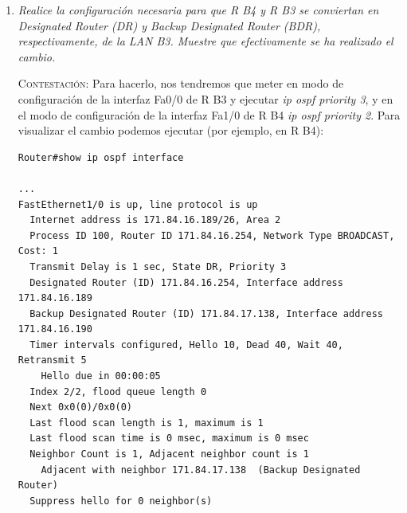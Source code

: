 \documentclass[11pt]{article}
\begin{document}
\begin{enumerate}
\begin{itemize}
    \item 171.84.17.134 (R B3) $\xrightarrow[\text{Se2/0}]{}$ 171.84.17.133 (R B1)

    \item 171.84.17.129 (R B1) $\xrightarrow[\text{Se2/0}]{}$ 171.84.17.130 (R B2)
    
    \item 171.84.16.126 (R B2) $\xrightarrow[\text{Fa0/0}]{}$ 171.84.16.1 (H B2)
\end{itemize}

\begin{mdframed}
\begin{verbatim}
Router>traceroute 171.84.16.1
Type escape sequence to abort.
Tracing the route to 171.84.16.1

  1   171.84.16.190   0 msec    0 msec    0 msec    
  2   171.84.17.133   0 msec    19 msec   0 msec    
  3   171.84.17.130   1 msec    1 msec    0 msec    
  4   171.84.16.1     1 msec    0 msec    1 msec    
\end{verbatim}
\end{mdframed}

$\hfill\square$

\vspace{12px}

\item \textit{Realice la configuración necesaria para que R B4 y R B3 se
conviertan en Designated Router (DR) y Backup Designated Router (BDR), respectivamente, de la LAN B3. Muestre que efectivamente se ha realizado el cambio.}

\vspace{7px}

\textsc{Contestación}: Para hacerlo, nos tendremos que meter en modo de configuración de la interfaz Fa0/0 de R B3 y ejecutar \textit{ip ospf priority 3}, y en el modo de configuración de la interfaz Fa1/0 de R B4 \textit{ip ospf priority 2}. Para visualizar el cambio podemos ejecutar (por ejemplo, en R B4):

\begin{mdframed}
\begin{verbatim}
Router#show ip ospf interface 

...
FastEthernet1/0 is up, line protocol is up
  Internet address is 171.84.16.189/26, Area 2
  Process ID 100, Router ID 171.84.16.254, Network Type BROADCAST, Cost: 1
  Transmit Delay is 1 sec, State DR, Priority 3
  Designated Router (ID) 171.84.16.254, Interface address 171.84.16.189
  Backup Designated Router (ID) 171.84.17.138, Interface address 171.84.16.190
  Timer intervals configured, Hello 10, Dead 40, Wait 40, Retransmit 5
    Hello due in 00:00:05
  Index 2/2, flood queue length 0
  Next 0x0(0)/0x0(0)
  Last flood scan length is 1, maximum is 1
  Last flood scan time is 0 msec, maximum is 0 msec
  Neighbor Count is 1, Adjacent neighbor count is 1
    Adjacent with neighbor 171.84.17.138  (Backup Designated Router)
  Suppress hello for 0 neighbor(s)
\end{verbatim}
\end{mdframed}


\end{enumerate}
\end{document}
